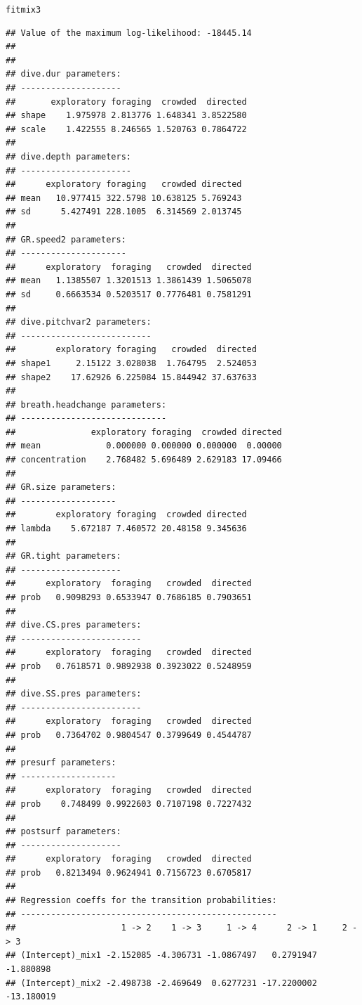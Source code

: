 \documentclass[12pt]{article}\usepackage[]{graphicx}\usepackage[]{xcolor}
\makeatletter
\newcommand{\hldef}[1]{\textcolor[rgb]{0.345,0.345,0.345}{#1}}%
\newenvironment{kframe}{%
 \def\at@end@of@kframe{}%
 \ifinner\ifhmode%
  \def\at@end@of@kframe{\end{minipage}}%
  \begin{minipage}{\columnwidth}%
 \fi\fi%
 \def\FrameCommand##1{\hskip\@totalleftmargin \hskip-\fboxsep
 \colorbox{shadecolor}{##1}\hskip-\fboxsep
     \hskip-\linewidth \hskip-\@totalleftmargin \hskip\columnwidth}%
 \MakeFramed {\advance\hsize-\width
   \@totalleftmargin\z@ \linewidth\hsize
   \@setminipage}}%
 {\par\unskip\endMakeFramed%
 \at@end@of@kframe}
\newenvironment{knitrout}{}{} %
\makeatother
\begin{document}
\begin{knitrout}
\begin{kframe}
{\ttfamily\noindent\itshape\color{messagecolor}{\#\# DONE}}\begin{alltt}
\hldef{fitmix3}
\end{alltt}
\begin{verbatim}
## Value of the maximum log-likelihood: -18445.14 
## 
## 
## dive.dur parameters:
## --------------------
##       exploratory foraging  crowded  directed
## shape    1.975978 2.813776 1.648341 3.8522580
## scale    1.422555 8.246565 1.520763 0.7864722
## 
## dive.depth parameters:
## ----------------------
##      exploratory foraging   crowded directed
## mean   10.977415 322.5798 10.638125 5.769243
## sd      5.427491 228.1005  6.314569 2.013745
## 
## GR.speed2 parameters:
## ---------------------
##      exploratory  foraging   crowded  directed
## mean   1.1385507 1.3201513 1.3861439 1.5065078
## sd     0.6663534 0.5203517 0.7776481 0.7581291
## 
## dive.pitchvar2 parameters:
## --------------------------
##        exploratory foraging   crowded  directed
## shape1     2.15122 3.028038  1.764795  2.524053
## shape2    17.62926 6.225084 15.844942 37.637633
## 
## breath.headchange parameters:
## -----------------------------
##               exploratory foraging  crowded directed
## mean             0.000000 0.000000 0.000000  0.00000
## concentration    2.768482 5.696489 2.629183 17.09466
## 
## GR.size parameters:
## -------------------
##        exploratory foraging  crowded directed
## lambda    5.672187 7.460572 20.48158 9.345636
## 
## GR.tight parameters:
## --------------------
##      exploratory  foraging   crowded  directed
## prob   0.9098293 0.6533947 0.7686185 0.7903651
## 
## dive.CS.pres parameters:
## ------------------------
##      exploratory  foraging   crowded  directed
## prob   0.7618571 0.9892938 0.3923022 0.5248959
## 
## dive.SS.pres parameters:
## ------------------------
##      exploratory  foraging   crowded  directed
## prob   0.7364702 0.9804547 0.3799649 0.4544787
## 
## presurf parameters:
## -------------------
##      exploratory  foraging   crowded  directed
## prob    0.748499 0.9922603 0.7107198 0.7227432
## 
## postsurf parameters:
## --------------------
##      exploratory  foraging   crowded  directed
## prob   0.8213494 0.9624941 0.7156723 0.6705817
## 
## Regression coeffs for the transition probabilities:
## ---------------------------------------------------
##                     1 -> 2    1 -> 3     1 -> 4      2 -> 1     2 -> 3
## (Intercept)_mix1 -2.152085 -4.306731 -1.0867497   0.2791947  -1.880898
## (Intercept)_mix2 -2.498738 -2.469649  0.6277231 -17.2200002 -13.180019

\end{verbatim}
\end{kframe}
\end{knitrout}
\end{document}
